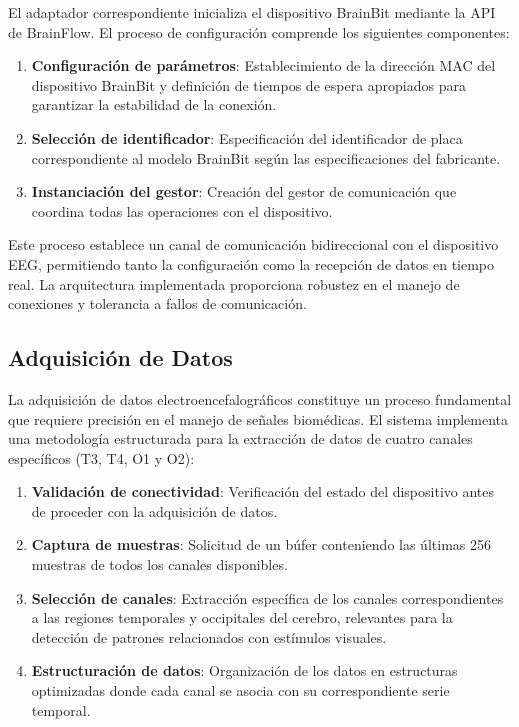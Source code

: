 El adaptador correspondiente inicializa el dispositivo BrainBit mediante la API de BrainFlow. El proceso de configuración comprende los siguientes componentes:

\begin{enumerate}
    \item \textbf{Configuración de parámetros}: Establecimiento de la dirección MAC del dispositivo BrainBit y definición de tiempos de espera apropiados para garantizar la estabilidad de la conexión.
    \item \textbf{Selección de identificador}: Especificación del identificador de placa correspondiente al modelo BrainBit según las especificaciones del fabricante.
    \item \textbf{Instanciación del gestor}: Creación del gestor de comunicación que coordina todas las operaciones con el dispositivo.
\end{enumerate}

Este proceso establece un canal de comunicación bidireccional con el dispositivo EEG, permitiendo tanto la configuración como la recepción de datos en tiempo real. La arquitectura implementada proporciona robustez en el manejo de conexiones y tolerancia a fallos de comunicación.

\subsection{Adquisición de Datos}

La adquisición de datos electroencefalográficos constituye un proceso fundamental que requiere precisión en el manejo de señales biomédicas. El sistema implementa una metodología estructurada para la extracción de datos de cuatro canales específicos (T3, T4, O1 y O2):

\begin{enumerate}
    \item \textbf{Validación de conectividad}: Verificación del estado del dispositivo antes de proceder con la adquisición de datos.
    
    \item \textbf{Captura de muestras}: Solicitud de un búfer conteniendo las últimas 256 muestras de todos los canales disponibles.
    
    \item \textbf{Selección de canales}: Extracción específica de los canales correspondientes a las regiones temporales y occipitales del cerebro, relevantes para la detección de patrones relacionados con estímulos visuales.
    
    \item \textbf{Estructuración de datos}: Organización de los datos en estructuras optimizadas donde cada canal se asocia con su correspondiente serie temporal.
\end{enumerate}

